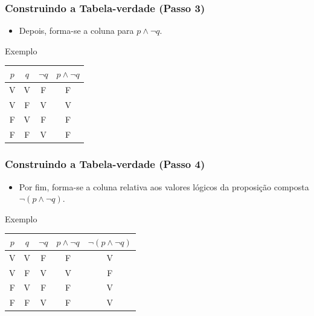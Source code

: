 \documentclass{beamer}
\begin{document}
\begin{frame}
\frametitle{Construindo a Tabela-verdade (Passo 3)}

\begin{itemize}
	\item Depois, forma-se a coluna para $p \wedge \neg q$.
\end{itemize}\vfill

\begin{exampleblock}{Exemplo}
	\center
	\begin{tabular}{|c|c|c|c|}
		\hline
		$p$ & $q$ & $\neg q$  &  $p \wedge \neg q$ \\ \hline
		V & V  & F & F\\ \hline
		V & F  & V & V\\ \hline
		F & V  & F & F\\ \hline
		F & F  & V & F\\ \hline
	\end{tabular}
\end{exampleblock}
\end{frame}

\begin{frame}
\frametitle{Construindo a Tabela-verdade (Passo 4)}

\begin{itemize}
	\item Por fim, forma-se a coluna relativa aos valores lógicos da proposição composta $\neg (p \wedge \neg q)$.
\end{itemize}\vfill

\begin{exampleblock}{Exemplo}
	\center
	\begin{tabular}{|c|c|c|c|c|}
		\hline
		$p$ & $q$ & $\neg q$  &  $p \wedge \neg q$ & $\neg (p \wedge \neg q)$\\ \hline
		V & V  & F & F & V\\ \hline
		V & F  & V & V & F\\ \hline
		F & V  & F & F & V\\ \hline
		F & F  & V & F& V\\ \hline
	\end{tabular}
\end{exampleblock}
\end{frame}
\end{document}
